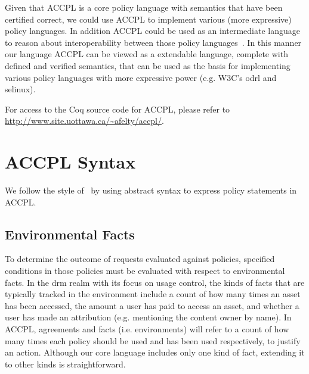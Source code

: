 \documentclass[runningheads,a4paper]{llncs}
\begin{document}
Given that \ac{ACCPL} is a core policy language with semantics that have been certified correct, we could use \ac{ACCPL} to implement various (more expressive) policy languages. In addition \ac{ACCPL} could be used as an intermediate language to reason about interoperability between those policy languages~\cite{prados2005interoperability,maronas2009architecture}. In this manner our language \ac{ACCPL} can be viewed as a extendable language, complete with defined and verified semantics, that can be used as the basis for implementing various policy languages with more expressive power (e.g. W3C's \ac{odrl} and \ac{selinux}). 

For access to the Coq source code for \ac{ACCPL}, please refer to \url{http://www.site.uottawa.ca/~afelty/accpl/}.

\section{ACCPL Syntax}

We follow the style of~\cite{pucella2006} by using abstract syntax to express policy statements in \ac{ACCPL}. 

\subsection{Environmental Facts}\label{sec:odrl0}
To determine the outcome of requests evaluated against policies,
specified conditions in those policies must be evaluated with respect
to environmental facts. In the \ac{drm} realm with its focus on usage
control, the kinds of facts that are typically tracked in the
environment include a count of how many times an asset has been
accessed, the amount a user has paid to access an asset, and whether a
user has made an attribution (e.g. mentioning the content owner by
name). In \ac{ACCPL}, agreements and facts (i.e. environments) will
refer to a count of how many times each policy should be used and has
been used respectively, to justify an action.
Although our core language includes only one kind of fact, extending
it to other kinds is straightforward.
\end{document}
